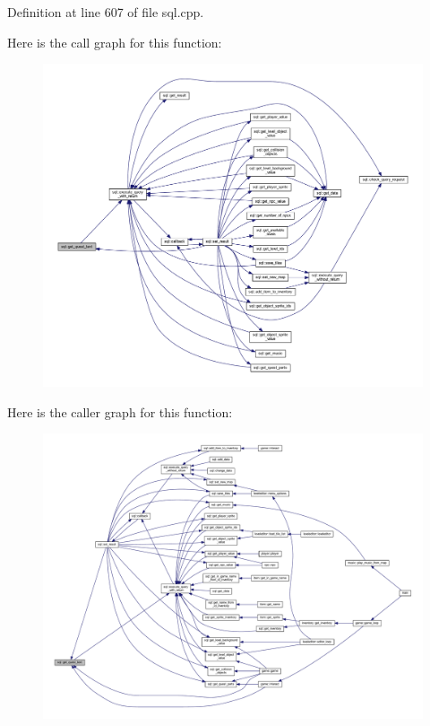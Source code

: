 Definition at line 607 of file sql.\+cpp.

Here is the call graph for this function\+:
\nopagebreak
\begin{figure}[H]
\begin{center}
\leavevmode
\includegraphics[width=350pt]{classsql_a59249e218b1bb9d811c50b5615312eaf_cgraph}
\end{center}
\end{figure}
Here is the caller graph for this function\+:
\nopagebreak
\begin{figure}[H]
\begin{center}
\leavevmode
\includegraphics[width=350pt]{classsql_a59249e218b1bb9d811c50b5615312eaf_icgraph}
\end{center}
\end{figure}
\mbox{\label{classsql_ad4d8bdf41eede1ae1363d0be8a2f60a9}} 
